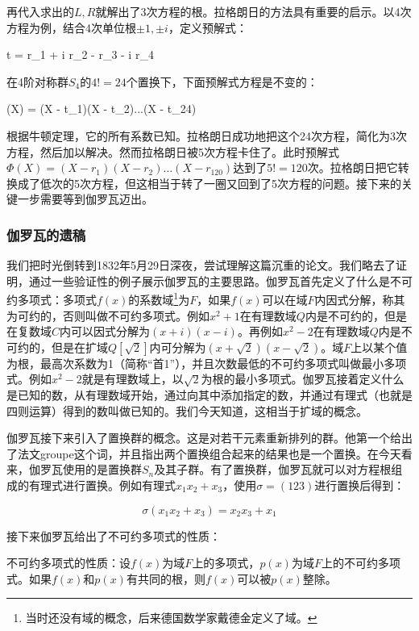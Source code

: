 \documentclass[b5paper]{ctexart}
\begin{document}
再代入求出的$L, R$就解出了3次方程的根。拉格朗日的方法具有重要的启示。以4次方程为例，结合4次单位根$\pm 1, \pm i$，定义预解式：

\be
t = r_1 + i r_2 - r_3 - i r_4
\ee

在4阶对称群$S_4$的$4! = 24$个置换下，下面预解式方程是不变的：

\be
\Phi(X) = (X - t_1)(X - t_2)...(X - t_{24})
\ee

根据牛顿定理，它的所有系数已知。拉格朗日成功地把这个24次方程，简化为3次方程，然后加以解决。然而拉格朗日被5次方程卡住了。此时预解式$\Phi(X) = (X - r_1)(X - r_2) ... (X - r_{120})$达到了$5! = 120$次。拉格朗日把它转换成了低次的5次方程，但这相当于转了一圈又回到了5次方程的问题。接下来的关键一步需要等到伽罗瓦迈出。

\subsubsection{伽罗瓦的遗稿}
 

我们把时光倒转到1832年5月29日深夜，尝试理解这篇沉重的论文。我们略去了证明，通过一些验证性的例子展示伽罗瓦的主要思路。伽罗瓦首先定义了什么是不可约多项式：多项式$f(x)$的系数域\footnote{当时还没有域的概念，后来德国数学家戴德金定义了域。}为$F$，如果$f(x)$可以在域$F$内因式分解，称其为可约的，否则叫做不可约多项式。例如$x^2 + 1$在有理数域$Q$内是不可约的，但是在复数域$C$内可以因式分解为$(x + i)(x - i)$。再例如$x^2 - 2$在有理数域$Q$内是不可约的，但是在扩域$Q[\sqrt{2}]$内可分解为$(x + \sqrt{2})(x - \sqrt{2})$。域$F$上以某个值为根，最高次系数为1（简称“首1”），并且次数最低的不可约多项式叫做最小多项式。例如$x^2 - 2$就是有理数域上，以$\sqrt{2}$为根的最小多项式。伽罗瓦接着定义什么是已知的数，从有理数域开始，通过向其中添加指定的数，并通过有理式（也就是四则运算）得到的数叫做已知的。我们今天知道，这相当于扩域的概念。

伽罗瓦接下来引入了置换群的概念。这是对若干元素重新排列的群。他第一个给出了法文groupe这个词，并且指出两个置换组合起来的结果也是一个置换。在今天看来，伽罗瓦使用的是置换群$S_n$及其子群。有了置换群，伽罗瓦就可以对方程根组成的有理式进行置换。例如有理式$x_1 x_2 + x_3$，使用$\sigma = (123)$进行置换后得到：

\[
\sigma(x_1 x_2 + x_3) = x_2 x_3 + x_1
\]

接下来伽罗瓦给出了不可约多项式的性质：

\begin{lemma}不可约多项式的性质：设$f(x)$为域$F$上的多项式，$p(x)$为域$F$上的不可约多项式。如果$f(x)$和$p(x)$有共同的根，则$f(x)$可以被$p(x)$整除。
\end{lemma}
\end{document}
